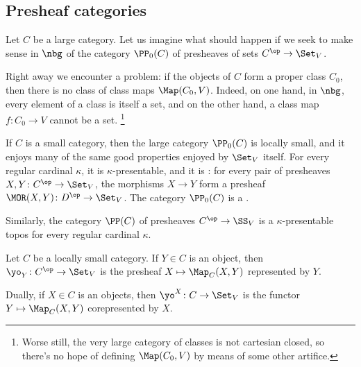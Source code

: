 \subsection{Presheaf categories}%
\label{sub:presheaf_categories}

Let $ C $ be a large category.
Let us imagine what should happen if we seek to make sense in $ \nbg $
of the category $ \PP_0(C) $ of presheaves of sets $ C^{\op} \to \Set_V $.

Right away we encounter a problem:
if the objects of $ C $ form a proper class $ C_ 0 $,
then there is no class of class maps $ \Map(C_0, V) $.
Indeed, on one hand, in $ \nbg $, every element of a class is itself a set,
and on the other hand, a class map $ f \colon C_0 \to V $ cannot be a set.%
\footnote{Worse still, the very large category of classes is not cartesian closed,
so there's no hope of defining $ \Map(C_0, V) $ by means of some other artifice.}

\begin{nul}
	If $ C $ is a small category, then 
	the large category $ \PP_0(C) $ is locally small,
	and it enjoys many of the same good properties enjoyed by $ \Set_V $ itself.
	For every regular cardinal $ \kappa $, it is $ \kappa $-presentable,
	and it is :
	for every pair of presheaves $ X, Y \colon C^{\op} \to \Set_V $,
	the morphisms $ X \to Y $ form a presheaf $ \MOR(X, Y) \colon D^{\op} \to \Set_V $.
	The category $ \PP_0(C) $ is a .

	Similarly, the category $ \PP(C) $ of presheaves $ C^{\op} \to \SS_V $
	is a $ \kappa $-presentable topos
	for every regular cardinal $ \kappa $.
\end{nul}

\begin{eg}
	Let $ C $ be a locally small category.
	If $ Y \in C $ is an object,
	then $ \yo_Y \colon C^{\op} \to \Set_V $ is
	the presheaf $ X \mapsto \Map_C(X,Y) $ represented by $ Y $.

	Dually, if $ X \in C $ is an objects,
	then $ \yo^X \colon C \to \Set_V $ is the functor
	$ Y \mapsto \Map_C(X,Y) $ corepresented by $ X $.
\end{eg}

